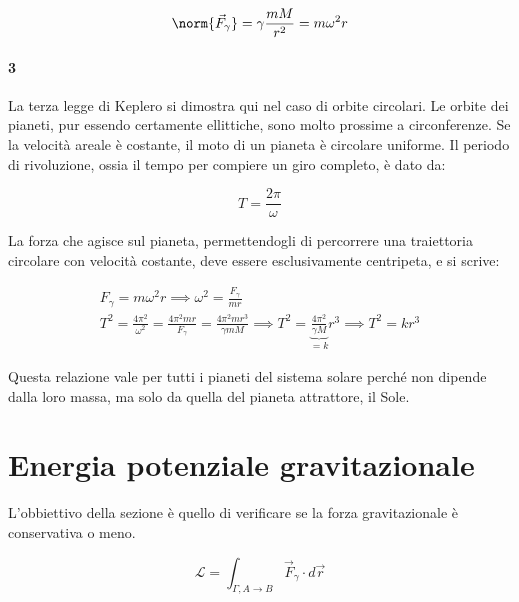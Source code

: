 \[
	\norm{\vec{F}_\gamma}=\gamma \frac{mM}{r^2}=m\omega^2r
\]

\paragraph{3} La terza legge di Keplero si dimostra qui nel caso di orbite circolari. Le orbite dei pianeti, pur essendo certamente ellittiche, sono molto prossime a circonferenze. Se la velocità areale è costante, il moto di un pianeta è circolare uniforme. Il periodo di rivoluzione, ossia il tempo per compiere un giro completo, è dato da:

\[
	T=\frac{2\pi}{\omega}
\]

La forza che agisce sul pianeta, permettendogli di percorrere una traiettoria circolare con velocità costante, deve essere esclusivamente centripeta, e si scrive:

\begin{gather*}
	F_\gamma=m\omega^2r \implies \omega^2=\frac{F_\gamma}{mr} \\
	T^2=\frac{4\pi^2}{\omega^2}=\frac{4\pi^2mr}{F_\gamma}=\frac{4\pi^2mr^3}{\gamma mM} \implies T^2=\underbrace{\frac{4\pi^2}{\gamma M}}_{=k} r^3 \implies T^2=kr^3
\end{gather*}

Questa relazione vale per tutti i pianeti del sistema solare perché non dipende dalla loro massa, ma solo da quella del pianeta attrattore, il Sole.

\section{Energia potenziale gravitazionale}

L'obbiettivo della sezione è quello di verificare se la forza gravitazionale è conservativa o meno.

\[
	\mathcal{L}=\int_{\Gamma, A\to B}\vec{F}_\gamma \cdot d\vec{r}
\]

